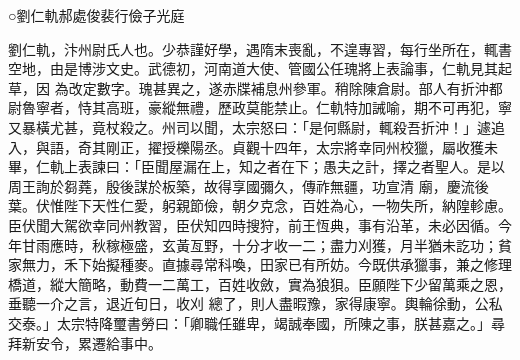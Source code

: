 
\begin{pinyinscope}

 ○劉仁軌郝處俊裴行儉子光庭



 劉仁軌，汴州尉氏人也。少恭謹好學，遇隋末喪亂，不遑專習，每行坐所在，輒書空地，由是博涉文史。武德初，河南道大使、管國公任瑰將上表論事，仁軌見其起草，因
 為改定數字。瑰甚異之，遂赤牒補息州參軍。稍除陳倉尉。部人有折沖都尉魯寧者，恃其高班，豪縱無禮，歷政莫能禁止。仁軌特加誡喻，期不可再犯，寧又暴橫尤甚，竟杖殺之。州司以聞，太宗怒曰：「是何縣尉，輒殺吾折沖！」遽追入，與語，奇其剛正，擢授櫟陽丞。貞觀十四年，太宗將幸同州校獵，屬收獲未畢，仁軌上表諫曰：「臣聞屋漏在上，知之者在下；愚夫之計，擇之者聖人。是以周王詢於芻蕘，殷後謀於板築，故得享國彌久，傳祚無疆，功宣清
 廟，慶流後葉。伏惟陛下天性仁愛，躬親節儉，朝夕克念，百姓為心，一物失所，納隍軫慮。臣伏聞大駕欲幸同州教習，臣伏知四時搜狩，前王恆典，事有沿革，未必因循。今年甘雨應時，秋稼極盛，玄黃亙野，十分才收一二；盡力刈獲，月半猶未訖功；貧家無力，禾下始擬種麥。直據尋常科喚，田家已有所妨。今既供承獵事，兼之修理橋道，縱大簡略，動費一二萬工，百姓收斂，實為狼狽。臣願陛下少留萬乘之恩，垂聽一介之言，退近旬日，收刈
 總了，則人盡暇豫，家得康寧。輿輪徐動，公私交泰。」太宗特降璽書勞曰：「卿職任雖卑，竭誠奉國，所陳之事，朕甚嘉之。」尋拜新安令，累遷給事中。




\end{pinyinscope}
